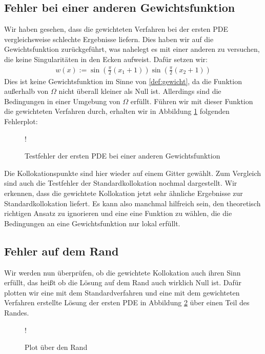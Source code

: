 \subsection{Fehler bei einer anderen Gewichtsfunktion}
\label{sec:andereGewicht}
Wir haben gesehen, dass die gewichteten Verfahren bei der ersten \ac{PDE} vergleichsweise schlechte Ergebnisse liefern. Dies haben wir auf die Gewichtsfunktion zurückgeführt, was nahelegt es mit einer anderen zu versuchen, die keine Singularitäten in den Ecken aufweist. Dafür setzen wir:
\begin{align*}
	w(x) := \sin\left(\frac{\pi}{2}(x_1+1)\right) \sin\left(\frac{\pi}{2}(x_2+1)\right)
\end{align*}
Dies ist keine Gewichtsfunktion im Sinne von \ref{def:gewicht}, da die Funktion außerhalb von $\Omega$ nicht überall kleiner als Null ist. Allerdings sind die Bedingungen in einer Umgebung von $\Omega$ erfüllt. Führen wir mit dieser Funktion die gewichteten Verfahren durch, erhalten wir in Abbildung \ref{fig:andereGewicht} folgenden Fehlerplot:
\begin{figure}[ht]
	\centering
	\resizebox {.85\columnwidth} {!} {
		
	}
	\caption{Testfehler der ersten \acs{PDE} bei einer anderen Gewichtsfunktion}
	\label{fig:andereGewicht}
\end{figure}
Die Kollokationspunkte sind hier wieder auf einem Gitter gewählt. Zum Vergleich sind auch die Testfehler der Standardkollokation nochmal dargestellt. Wir erkennen, dass die gewichtete Kollokation jetzt sehr ähnliche Ergebnisse zur Standardkollokation liefert. Es kann also manchmal hilfreich sein, den theoretisch richtigen Ansatz zu ignorieren und eine eine Funktion zu wählen, die die Bedingungen an eine Gewichtsfunktion nur lokal erfüllt.

\subsection{Fehler auf dem Rand}
Wir werden nun überprüfen, ob die gewichtete Kollokation auch ihren Sinn erfüllt, das heißt ob die Lösung auf dem Rand auch wirklich Null ist. Dafür plotten wir eine mit dem Standardverfahren und eine mit dem gewichteten Verfahren erstellte Lösung der ersten \ac{PDE} in Abbildung \ref{fig:rand-vergleich} über einen Teil des Randes.

\begin{figure}[ht]
\centering
\resizebox {.85\columnwidth} {!} {

}
\caption{Plot über den Rand}
\label{fig:rand-vergleich}
\end{figure}


